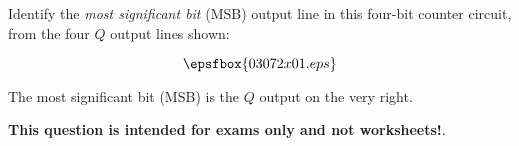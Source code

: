 

Identify the {\it most significant bit} (MSB) output line in this four-bit counter circuit, from the four $Q$ output lines shown:

$$\epsfbox{03072x01.eps}$$







The most significant bit (MSB) is the $Q$ output on the very right.







{\bf This question is intended for exams only and not worksheets!}.




